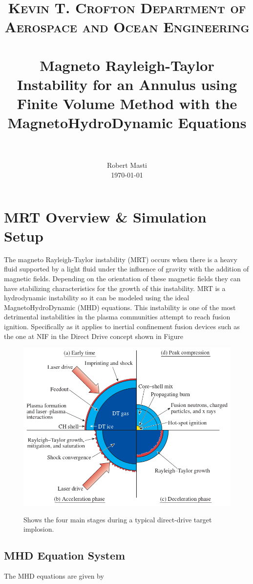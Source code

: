 \documentclass[paper=a4, fontsize=11pt]{scrartcl}
\title{%
    \usefont{OT1}{bch}{b}{n}
    \normalfont\normalsize \textsc{Kevin T. Crofton Department of Aerospace and Ocean Engineering} \\ [25pt]
    \horrule{0.5pt} \\[0.4cm]
    \huge Magneto Rayleigh-Taylor Instability for an Annulus using Finite Volume Method with the MagnetoHydroDynamic Equations  \\
    \horrule{2pt} \\[0.5cm]}
\author{\normalfont\normalsize
  Robert Masti\\[-3pt]  
  \normalsize\today}
\date{}
\numberwithin{equation}{section}                %
\numberwithin{figure}{section}                  %
\numberwithin{table}{section}                           %
\begin{document}
\maketitle
\section{MRT Overview \& Simulation Setup}\label{sec:ovrvw}
The magneto Rayleigh-Taylor instability (MRT) occurs when there is a heavy fluid supported by a light fluid under the influence of gravity with the addition of magnetic fields. Depending on the orientation of these magnetic fields they can have stabilizing characteristics for the growth of this instability. MRT is a hydrodynamic instability so it can be modeled using the ideal MagnetoHydroDynamic (MHD) equations. This instability is one of the most detrimental instabilities in the plasma communities attempt to reach fusion ignition. Specifically as it applies to inertial confinement fusion devices such as the one at NIF in the Direct Drive concept shown in Figure


  \begin{figure}[!htb]
    \centering
    \includegraphics[width=0.9\linewidth]{fig/DDfusion}\label{fig:ovrvw:dd}
    \caption{Shows the four main stages during a typical direct-drive target implosion.\cite{craxton2015}}
  \end{figure}
 



\subsection{MHD Equation System}

The MHD equations are given by
\end{document}
